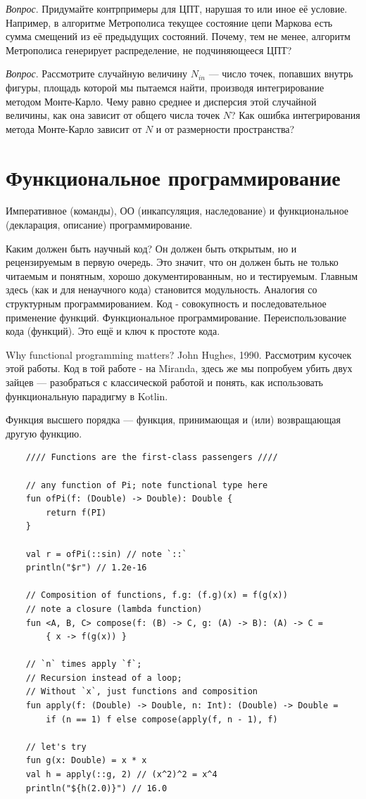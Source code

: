 \documentclass{book}
\begin{document}
\textit{Вопрос}. Придумайте контрпримеры для ЦПТ, нарушая то или иное её условие. Например, в
алгоритме Метрополиса текущее состояние цепи Маркова есть сумма смещений из её предыдущих
состояний. Почему, тем не менее, алгоритм Метрополиса генерирует распределение, не подчиняющееся
ЦПТ?

\textit{Вопрос}. Рассмотрите случайную величину $N_{in}$ --- число точек, попавших внутрь фигуры,
площадь которой мы пытаемся найти, производя интегрирование методом Монте-Карло. Чему равно среднее
и дисперсия этой случайной величины, как она зависит от общего числа точек $N$? Как ошибка
интегрирования метода Монте-Карло зависит от $N$ и от размерности пространства?

\section{Функциональное программирование}

Императивное (команды), ОО (инкапсуляция, наследование) и функциональное (декларация, описание)
программирование.

Каким должен быть научный код? Он должен быть открытым, но и рецензируемым в первую очередь. Это
значит, что он должен быть не только читаемым и понятным, хорошо документированным, но и
тестируемым.  Главным здесь (как и для ненаучного кода) становится модульность. Аналогия со
структурным программированием. Код - совокупность и последовательное применение функций.
Функциональное программирование. Переиспользование кода (функций). Это ещё и ключ к простоте кода.

Why functional programming matters? John Hughes, 1990. Рассмотрим кусочек этой работы. Код в той
работе - на Miranda, здесь же мы попробуем убить двух зайцев --- разобраться с классической работой
и понять, как использовать функциональную парадигму в Kotlin.

Функция высшего порядка --- функция, принимающая и (или) возвращающая другую функцию.

\begin{verbatim}
    //// Functions are the first-class passengers ////

    // any function of Pi; note functional type here
    fun ofPi(f: (Double) -> Double): Double {
        return f(PI)
    }

    val r = ofPi(::sin) // note `::`
    println("$r") // 1.2e-16

    // Composition of functions, f.g: (f.g)(x) = f(g(x))
    // note a closure (lambda function)
    fun <A, B, C> compose(f: (B) -> C, g: (A) -> B): (A) -> C =
        { x -> f(g(x)) }

    // `n` times apply `f`;
    // Recursion instead of a loop;
    // Without `x`, just functions and composition
    fun apply(f: (Double) -> Double, n: Int): (Double) -> Double =
        if (n == 1) f else compose(apply(f, n - 1), f)

    // let's try
    fun g(x: Double) = x * x
    val h = apply(::g, 2) // (x^2)^2 = x^4
    println("${h(2.0)}") // 16.0
\end{verbatim}
\end{document}
